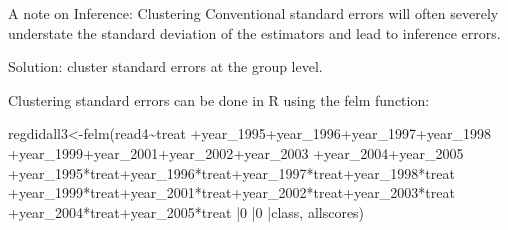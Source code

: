 \documentclass[
  ignorenonframetext,
]{beamer}
\newenvironment{Shaded}{\begin{snugshade}}{\end{snugshade}}
\newcommand{\DecValTok}[1]{\textcolor[rgb]{0.00,0.00,0.81}{#1}}
\newcommand{\FunctionTok}[1]{\textcolor[rgb]{0.00,0.00,0.00}{#1}}
\newcommand{\NormalTok}[1]{#1}
\newcommand{\OtherTok}[1]{\textcolor[rgb]{0.56,0.35,0.01}{#1}}
\newcommand{\SpecialCharTok}[1]{\textcolor[rgb]{0.00,0.00,0.00}{#1}}
\begin{document}
\begin{frame}[fragile]{A note on Inference: Clustering}
\protect\hypertarget{a-note-on-inference-clustering-1}{}
Conventional standard errors will often severely understate the standard
deviation of the estimators and lead to inference errors.

Solution: cluster standard errors at the group level.

Clustering standard errors can be done in R using the felm function:
\tiny

\begin{Shaded}
\begin{Highlighting}[]
\NormalTok{regdidall3}\OtherTok{\textless{}{-}}\FunctionTok{felm}\NormalTok{(read4}\SpecialCharTok{\textasciitilde{}}\NormalTok{treat}
                 \SpecialCharTok{+}\NormalTok{year\_1995}\SpecialCharTok{+}\NormalTok{year\_1996}\SpecialCharTok{+}\NormalTok{year\_1997}\SpecialCharTok{+}\NormalTok{year\_1998}
                 \SpecialCharTok{+}\NormalTok{year\_1999}\SpecialCharTok{+}\NormalTok{year\_2001}\SpecialCharTok{+}\NormalTok{year\_2002}\SpecialCharTok{+}\NormalTok{year\_2003}
                 \SpecialCharTok{+}\NormalTok{year\_2004}\SpecialCharTok{+}\NormalTok{year\_2005}
                 \SpecialCharTok{+}\NormalTok{year\_1995}\SpecialCharTok{*}\NormalTok{treat}\SpecialCharTok{+}\NormalTok{year\_1996}\SpecialCharTok{*}\NormalTok{treat}\SpecialCharTok{+}\NormalTok{year\_1997}\SpecialCharTok{*}\NormalTok{treat}\SpecialCharTok{+}\NormalTok{year\_1998}\SpecialCharTok{*}\NormalTok{treat}
                 \SpecialCharTok{+}\NormalTok{year\_1999}\SpecialCharTok{*}\NormalTok{treat}\SpecialCharTok{+}\NormalTok{year\_2001}\SpecialCharTok{*}\NormalTok{treat}\SpecialCharTok{+}\NormalTok{year\_2002}\SpecialCharTok{*}\NormalTok{treat}\SpecialCharTok{+}\NormalTok{year\_2003}\SpecialCharTok{*}\NormalTok{treat}
                 \SpecialCharTok{+}\NormalTok{year\_2004}\SpecialCharTok{*}\NormalTok{treat}\SpecialCharTok{+}\NormalTok{year\_2005}\SpecialCharTok{*}\NormalTok{treat}
                 \SpecialCharTok{|}\DecValTok{0}
                 \SpecialCharTok{|}\DecValTok{0}
                 \SpecialCharTok{|}\NormalTok{class,}
\NormalTok{                 allscores)}
\end{Highlighting}
\end{Shaded}
\end{frame}
\end{document}

